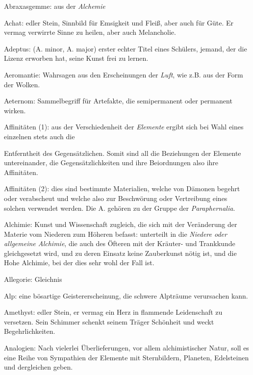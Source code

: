 \documentclass[a5paper,8pt]{book}
\begin{document}
\begin{small}

\begin{description}

  \item Abraxasgemme: aus der \textit{Alchemie}\
 \item Achat: edler Stein, Sinnbild für Emsigkeit und Fleiß, aber auch für Güte. Er vermag verwirrte Sinne zu heilen, aber auch Melancholie.\
 \item Adeptus: (A. minor, A. major) erster echter Titel eines Schülers, jemand, der die Lizenz erworben hat, seine Kunst frei zu lernen.\
 \item Aeromantie: Wahrsagen aus den Erscheinungen der \textit{Luft}, wie z.B. aus der Form der Wolken.\
 \item Aeternom: Sammelbegriff für Artefakte, die semipermanent oder permanent wirken.\
 \item Affinitäten (1): aus der Verschiedenheit der \textit{Elemente} ergibt sich bei Wahl eines einzelnen stets auch die 
 \item Entferntheit des Gegensätzlichen. Somit sind all die Beziehungen der Elemente untereinander, die Gegensätzlichkeiten und 
ihre Beiordnungen also ihre Affinitäten.\
 \item Affinitäten (2): dies sind bestimmte Materialien, welche von Dämonen begehrt oder verabscheut und welche also zur 
Beschwörung oder Vertreibung eines solchen verwendet werden. Die A. gehören zu der Gruppe der \textit{Paraphernalia}.
 \item Alchimie: Kunst und Wissenschaft zugleich, die sich mit der Veränderung der Materie vom Niederen zum Höheren befasst: 
unterteilt in die \textit{Niedere oder allgemeine Alchimie}, die auch des Öfteren mit der Kräuter- und Trankkunde gleichgesetzt wird, und zu deren Einsatz keine Zauberkunst nötig ist, und die \textit{}Hohe Alchimie, bei der dies sehr wohl der Fall ist.
 \item Allegorie: Gleichnis
 \item Alp: eine bösartige Geistererscheinung, die schwere Alpträume verursachen kann.
 \item Amethyst: edler Stein, er vermag ein Herz in flammende Leidenschaft zu versetzen. Sein Schimmer schenkt seinem Träger Schönheit und weckt Begehrlichkeiten.
 \item Analogien: Nach vielerlei Überlieferungen, vor allem alchimistischer Natur, soll es eine Reihe von Sympathien der Elemente mit Sternbildern, Planeten, Edelsteinen und dergleichen geben.

\end{description}
\end{small}
\end{document}
